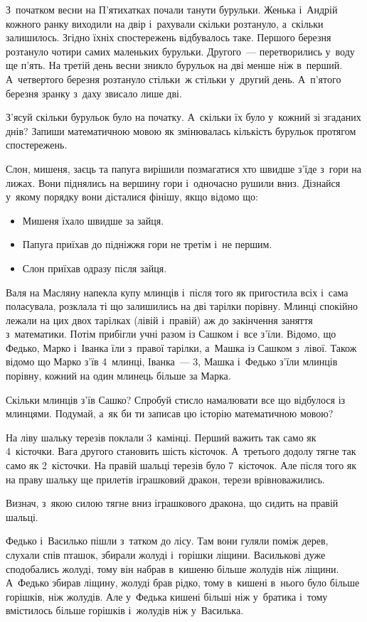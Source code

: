 \problem
З~початком весни на П'ятихатках почали танути бурульки.
Женька і~Андрій кожного ранку виходили на двір і~рахували скільки розтануло,
а~скільки залишилось.
Згідно їхніх спостережень відбувалось таке.
Першого березня розтануло чотири самих маленьких бурульки.
Другого~--- перетворились у~воду ще п'ять.
На третій день весни зникло бурульок на дві менше ніж в~перший.
А~четвертого березня розтануло стільки~ж стільки у~другий день.
А~п'ятого березня зранку з~даху звисало лише дві.

З'ясуй скільки бурульок було на початку.
А~скільки їх було у~кожний зі згаданих днів?
Запиши математичною мовою як змінювалась кількість бурульок
протягом спостережень.


\problem
Слон, мишеня, заєць та папуга вирішили позмагатися хто швидше з'їде
з~гори на лижах. Вони піднялись на вершину гори і~одночасно рушили вниз.
Дізнайся у~якому порядку вони дісталися фінішу, якщо відомо що:
\begin{itemize}
    \item Мишеня їхало швидше за зайця.
    \item Папуга приїхав до підніжжя гори не третім і~не першим.
    \item Слон приїхав одразу після зайця.
\end{itemize}


\problem
Валя на Масляну напекла купу млинців і~після того як пригостила всіх
і~сама поласувала, розклала ті що залишились на дві тарілки порівну.
Млинці спокійно лежали на цих двох тарілках (лівій і~правій)
аж до закінчення заняття з~математики.
Потім прибігли учні разом із Сашком і~все з'їли.
Відомо, що Федько, Марко і~Іванка їли з~правої тарілки,
а~Машка із Сашком з~лівої.
Також відомо що Марко з'їв 4~млинці, Іванка~--- 3,
Машка і~Федько з'їли млинців порівну, кожний на один млинець більше за Марка.

Скільки млинців з'їв Сашко?
Спробуй стисло намалювати все що відбулося із млинцями.
Подумай, а~як би ти записав цю історію математичною мовою?


\problem
На ліву шальку терезів поклали 3~камінці.
Перший важить так само як 4~кісточки.
Вага другого становить шість кісточок.
А~третього додолу тягне так само як 2~кісточки.
На правій шальці терезів було 7~кісточок.
Але після того як на праву шальку ще прилетів іграшковий дракон,
терези врівноважились.

Визнач, з~якою силою тягне вниз іграшкового дракона,
що сидить на правій шальці.


\problem
Федько і~Василько пішли з~татком до лісу.
Там вони гуляли поміж дерев, слухали спів пташок,
збирали жолуді і~горішки ліщини. 
Василькові дуже сподобались жолуді, тому він набрав в~кишеню більше
жолудів ніж ліщини. А~Федько збирав ліщину, жолуді брав рідко,
тому в~кишені в~нього було більше горішків, ніж жолудів. 
Але у~Федька кишені більші ніж у~братика і~тому вмістилось
більше горішків і~жолудів ніж у~Василька. 

